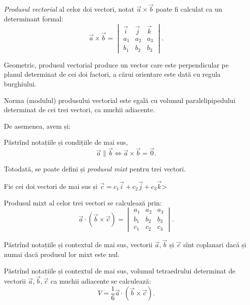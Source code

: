 \emph{Produsul vectorial} al celor doi vectori, notat $ \vec{a} \times \vec{b} $
poate fi calculat ca un determinant formal:
\[
  \vec{a} \times \vec{b} = %
  \begin{vmatrix}
    \vec{i} & \vec{j} & \vec{k} \\
    a_1 & a_2 & a_3 \\
    b_1 & b_2 & b_3
  \end{vmatrix}.
\]

Geometric, produsul vectorial produce un vector care este perpendicular pe
planul determinat de cei doi factori, a cărui orientare este dată cu regula
burghiului.

\begin{proposition}\label{pr:vol-paral}
  Norma (modulul) produsului vectorial este egală cu volumul paralelipipedului
  determinat de cei trei vectori, ca muchii adiacente.
\end{proposition}

De asemenea, avem și:
\begin{proposition}\label{pr:prod-vec-paral}
  Păstrînd notațiile și condițiile de mai sus,
  \[
    \vec{a} \parallel \vec{b} \Leftrightarrow \vec{a} \times \vec{b} = \vec{0}.
  \]
\end{proposition}

Totodată, se poate defini și \emph{produsul mixt} pentru trei vectori.

Fie cei doi vectori de mai sus și $ \vec{c} = c_1 \vec{i} + c_2 \vec{j} + c_3 \vec{k} $>

Produsul mixt al celor trei vectori se calculează prin:
\[
  \vec{a} \cdot (\vec{b} \times \vec{c}) = %
  \begin{vmatrix}
    a_1 & a_2 & a_3 \\
    b_1 & b_2 & b_3 \\
    c_1 & c_2 & c_3
  \end{vmatrix}.
\]

\begin{proposition}\label{pr:vectori-copl}
  Păstrînd notațiile și contextul de mai sus, vectorii $ \vec{a}, \vec{b} $
  și $ \vec{c} $ sînt coplanari dacă și numai dacă produsul lor mixt este nul.
\end{proposition}

\begin{proposition}\label{pr:volum-tetra}
  Păstrînd notațiile și contextul de mai sus, volumul tetraedrului determinat
  de vectorii $ \vec{a}, \vec{b}, \vec{c} $ ca muchii adiacente se calculează:
  \[
    V = \dfrac{1}{6} \vec{a} \cdot (\vec{b} \times \vec{c}).
  \]
\end{proposition}


